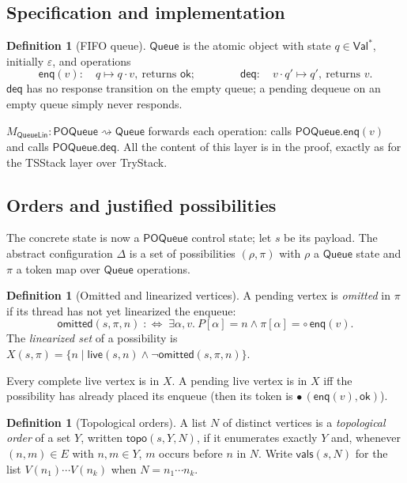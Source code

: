 \documentclass[11pt]{article}
\theoremstyle{definition}
\newtheorem{definition}[lemma]{Definition}
\theoremstyle{remark}
\newcommand{\Val}{\mathsf{Val}}
\newcommand{\Enq}{\mathsf{enq}}
\newcommand{\Deq}{\mathsf{deq}}
\newcommand{\ok}{\mathsf{ok}}
\newcommand{\live}{\mathsf{live}}
\newcommand{\omitted}{\mathsf{omitted}}
\newcommand{\topo}{\mathsf{topo}}
\newcommand{\vals}{\mathsf{vals}}
\newcommand{\poss}{\Delta}
\newcommand{\abst}{\rho}
\newcommand{\tokens}{\pi}
\newcommand{\code}[1]{\texttt{\detokenize{#1}}}
\newcommand{\POQueue}{\mathsf{POQueue}}
\newcommand{\Queue}{\mathsf{Queue}}
\newcommand{\QLin}{\mathsf{QueueLin}}
\newcommand{\refines}{\rightsquigarrow}
\newcommand{\tok}[1]{\circ\,#1}
\newcommand{\done}[2]{\bullet\,(#1,#2)}
\begin{document}
\subsection{Specification and implementation}

\begin{definition}[FIFO queue]
$\Queue$ is the atomic object with state $q \in \Val^{*}$, initially
$\varepsilon$, and operations
\[
\Enq(v) : \quad q \mapsto q \cdot v,\ \text{returns } \ok;
\qquad\qquad
\Deq : \quad v \cdot q' \mapsto q',\ \text{returns } v.
\]
$\Deq$ has no response transition on the empty queue; a pending dequeue
on an empty queue simply never responds.
\end{definition}

$M_{\QLin} : \POQueue \refines \Queue$ forwards each operation:
\code{enq(v)} calls $\POQueue.\Enq(v)$ and \code{deq()} calls
$\POQueue.\Deq$.  All the content of this layer is in the proof, exactly as
for the TSStack layer over TryStack.

\subsection{Orders and justified possibilities}

The concrete state is now a $\POQueue$ control state; let $s$ be its payload.
The abstract configuration $\poss$ is a set of possibilities $(\abst,
\tokens)$ with $\abst$ a $\Queue$ state and $\tokens$ a token map over
$\Queue$ operations.

\begin{definition}[Omitted and linearized vertices]
A pending vertex is \emph{omitted} in $\tokens$ if its thread has not yet
linearized the enqueue:
\[
\omitted(s, \tokens, n) \;:\Leftrightarrow\;
\exists \alpha, v.\ P[\alpha] = n \wedge \tokens[\alpha] = \tok{\Enq(v)}.
\]
The \emph{linearized set} of a possibility is
$X(s, \tokens) = \{ n \mid \live(s, n) \wedge \neg\omitted(s, \tokens, n) \}$.
\end{definition}

Every complete live vertex is in $X$.  A pending live vertex is in $X$ iff
the possibility has already placed its enqueue (then its token is
$\done{\Enq(v)}{\ok}$).

\begin{definition}[Topological orders]
A list $N$ of distinct vertices is a \emph{topological order} of a set
$Y$, written $\topo(s, Y, N)$, if it enumerates exactly $Y$ and, whenever
$(n, m) \in E$ with $n, m \in Y$, $m$ occurs before $n$ in $N$.  Write
$\vals(s, N)$ for the list $V(n_1) \cdots V(n_k)$ when $N = n_1 \cdots n_k$.
\end{definition}
\end{document}
